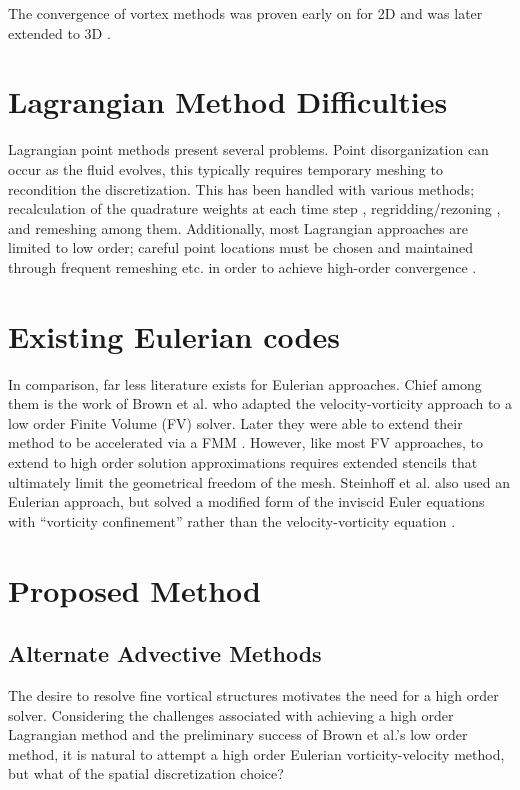 \documentclass[letterpaper,12pt]{report}
\begin{document}
The convergence of vortex methods was proven early on for 2D \cite{Convg2D} and was later extended to 3D \cite{Convg3D}.

\section{Lagrangian Method Difficulties}
Lagrangian point methods present several problems. Point disorganization can occur as the fluid evolves, this typically requires temporary meshing to recondition the discretization. This has been handled with various methods; recalculation of the quadrature weights at each time step \cite{Remesh2,Remesh3}, regridding/rezoning \cite{Remesh4}, and remeshing \cite{Remesh5} among them. Additionally, most Lagrangian approaches are limited to low order; careful point locations must be chosen and maintained through frequent remeshing etc. in order to achieve high-order convergence \cite{Strain1997}.

\section{Existing Eulerian codes}
In comparison, far less literature exists for Eulerian approaches. Chief among them is the work of Brown et al. \cite{Brown2000} who adapted the velocity-vorticity approach to a low order Finite Volume (FV) solver. Later they were able to extend their method to be accelerated via a FMM \cite{Brown2004}. However, like most FV approaches, to extend to high order solution approximations requires extended stencils that ultimately limit the geometrical freedom of the mesh. Steinhoff et al. also used an Eulerian approach, but solved a modified form of the inviscid Euler equations with ``vorticity confinement'' rather than the velocity-vorticity equation \cite{SteinhoffUnderhill1994}.
%
\section{Proposed Method}
\subsection{Alternate Advective Methods}
The desire to resolve fine vortical structures motivates the need for a high order solver. Considering the challenges associated with achieving a high order Lagrangian method and the preliminary success of Brown et al.'s low order method, it is natural to attempt a high order Eulerian vorticity-velocity method, but what of the spatial discretization choice?
\end{document}

